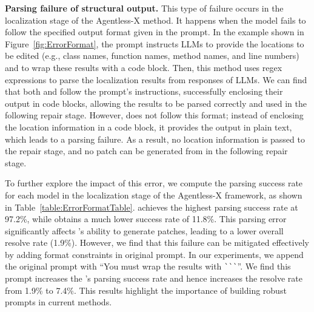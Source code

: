 
\textbf{Parsing failure of structural output.} \label{sec:parseError}
This type of failure occurs in the localization stage of the Agentless-X method. It happens when the model fails to follow the specified output format given in the prompt.
In the example shown in Figure~\ref{fig:ErrorFormat}, the prompt instructs LLMs to provide the locations to be edited (e.g., class names, function names, method names, and line numbers) and to wrap these results with a code block. Then, this method uses regex expressions to parse the localization results from responses of LLMs. We can find that both \GPT and \DeepSeek follow the prompt's instructions, successfully enclosing their output in code blocks, allowing the results to be parsed correctly and used in the following repair stage. However, \Claude does not follow this format; instead of enclosing the location information in a code block, it provides the output in plain text, which leads to a parsing failure. As a result, no location information is passed to the repair stage, and no patch can be generated from \Claude in the following repair stage.  

To further explore the impact of this error, we compute the parsing success rate for each model in the localization stage of the Agentless-X framework, as shown in Table~\ref{table:ErrorFormatTable}. \GPT achieves the highest parsing success rate at 97.2\%, while \Claude obtains a much lower success rate of 11.8\%. This parsing error significantly affects \Claude's ability to generate patches, leading to a lower overall resolve rate (1.9\%). However, we find that this failure can be mitigated effectively by adding format constraints in original prompt. In our experiments, we append the original prompt with ``You must wrap the results with \verb|```|''. We find this prompt increases the \Claude's parsing success rate and hence increases the resolve rate from 1.9\% to 7.4\%. This results highlight the importance of building robust prompts in current methods.

